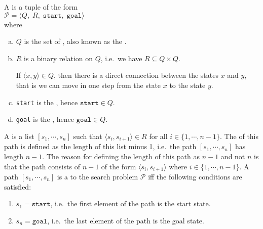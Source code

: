 \begin{Definition}
  A   is a tuple of the form
  \\[0.2cm]
  \hspace*{1.3cm}
  $\mathcal{P} = \langle Q,\;R,\; \mathtt{start},\; \mathtt{goal}\rangle$
  \\[0.2cm]
  where
  \begin{enumerate}[(a)]
  \item $Q$ is the set of , also known as the .
  \item $R$ is a binary relation on $Q$, i.e.~we have $R \subseteq Q \times Q$.

        If $\langle x, y \rangle \in Q$, then there is a direct connection between the states $x$ and $y$,
        that is we can move in one step from the state $x$ to the state $y$.
  \item \texttt{start} is the , hence $\mathtt{start} \in Q$.
  \item \texttt{goal} is the , hence $\mathtt{goal} \in Q$.    
  \end{enumerate}
  A   is a list $[s_1, \cdots, s_n]$ such that $\langle s_{i}, s_{i+1} \rangle \in R$
  for all $i \in \{1,\cdots,n-1\}$.  The  of this path is defined as the length of this list minus
  1, i.e.~the path $[s_1, \cdots, s_n]$ has length $n-1$.  The reason for defining the length of this path as
  $n-1$ and not $n$ is that the path consists of $n-1$   of the form $\langle s_i, s_{i+1} \rangle$ where
  $i \in \{1, \cdots, n-1\}$.
  A path $[s_1, \cdots, s_n]$ is a  to the search problem $\mathcal{P}$ iff the following conditions are satisfied:
  \begin{enumerate}
  \item $s_1 = \mathtt{start}$, i.e.~the first element of the path is the start state.
  \item $s_n = \mathtt{goal}$, i.e.~the last element of the path is the goal state. \eox
  \end{enumerate}
\end{Definition}

